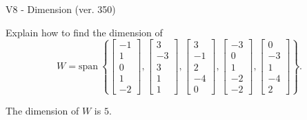 \begin{exercise}
  \begin{exerciseTitle}V8 - Dimension (ver. 350)\end{exerciseTitle}
  \begin{exerciseStatement}
    Explain how to find the dimension of 
\[W=\mathrm{span}\ \left\{\left[\begin{array}{r}
-1 \\
1 \\
0 \\
1 \\
-2
\end{array}\right] , \left[\begin{array}{r}
3 \\
-3 \\
3 \\
1 \\
1
\end{array}\right] , \left[\begin{array}{r}
3 \\
-1 \\
2 \\
-4 \\
0
\end{array}\right] , \left[\begin{array}{r}
-3 \\
0 \\
1 \\
-2 \\
-2
\end{array}\right] , \left[\begin{array}{r}
0 \\
-3 \\
1 \\
-4 \\
2
\end{array}\right]\right\}.\]



  \end{exerciseStatement}
  \begin{exerciseAnswer}
   The dimension of \(W\) is  \(5\).
  


  \end{exerciseAnswer}
\end{exercise}